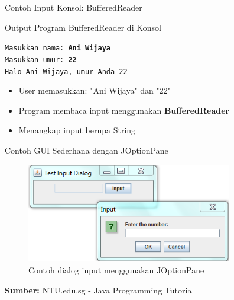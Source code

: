 \documentclass{beamer}
\begin{document}
\begin{frame}{Contoh Input Konsol: BufferedReader}
  \begin{block}{Output Program BufferedReader di Konsol}
    \colorbox{gray!20}{
      \parbox{0.9\textwidth}{
        \texttt{Masukkan nama: \textbf{Ani Wijaya}\\
        Masukkan umur: \textbf{22}\\
        Halo Ani Wijaya, umur Anda 22}
      }
    }
  \end{block}
  \begin{itemize}
    \item User memasukkan: "Ani Wijaya" dan "22"
    \item Program membaca input menggunakan \textbf{BufferedReader}
    \item Menangkap input berupa String
  \end{itemize}
\end{frame}

\begin{frame}{Contoh GUI Sederhana dengan JOptionPane}
  \begin{figure}[h]
    \centering
    \includegraphics[width=0.8\textwidth]{Input dan GUI Sederhana/InputDialog.png}
    \caption{Contoh dialog input menggunakan JOptionPane}
    \label{fig:joptionpane}
  \end{figure}
  \begin{block}{}
    \textbf{Sumber: }NTU.edu.sg - Java Programming Tutorial
  \end{block}
\end{frame}

\end{document}
